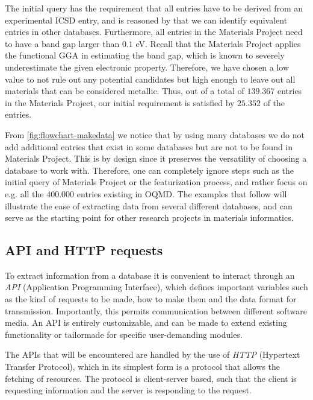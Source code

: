 

\noindent The initial query has the requirement that all entries have to be derived from an experimental ICSD entry, and is reasoned by that we can identify equivalent entries in other databases. Furthermore, all entries in the Materials Project need to have a band gap larger than $0.1$ eV. Recall that the Materials Project applies the functional GGA in estimating the band gap, which is known to severely underestimate the given electronic property. Therefore, we have chosen a low value to not rule out any potential candidates but high enough to leave out all materials that can be considered metallic. Thus, out of a total of $139.367$ entries in the Materials Project, our initial requirement is satisfied by $25.352$ of the entries.

From \autoref{fig:flowchart-makedata} we notice that by using many databases we do not add additional entries that exist in some databases but are not to be found in Materials Project. This is by design since it preserves the versatility of choosing a database to work with. Therefore, one can completely ignore steps such as the initial query of Materials Project or the featurization process, and rather focus on e.g. all the $400.000$ entries existing in OQMD. The examples that follow will illustrate the ease of extracting data from several different databases, and can serve as the starting point for other research projects in materials informatics.

\subsection{API and HTTP requests}

To extract information from a database it is convenient to interact through an \textit{API} (Application Programming Interface), which defines important variables such as the kind of requests to be made, how to make them and the data format for transmission. Importantly, this permits communication between different software media. An API is entirely customizable, and can be made to extend existing functionality or tailormade for specific user-demanding modules.

The APIs that will be encountered are handled by the use of \textit{HTTP} (Hypertext Transfer Protocol), which in its simplest form is a protocol that allows the fetching of resources. The protocol is client-server based, such that the client is requesting information and the server is responding to the request.

